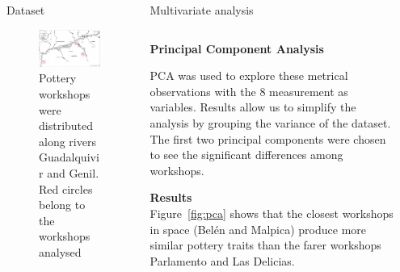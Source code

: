 \documentclass[final]{beamer}
\newlength{\sepwid}
\newlength{\onecolwid}
\newlength{\twocolwid}
\begin{document}
\begin{frame}[t]
\begin{columns}[t]
\begin{column}{\onecolwid}
\begin{block}{Dataset}
\begin{figure}
\includegraphics[width=0.7\linewidth]{images/fig1.png}
\caption{Pottery workshops were distributed along rivers Guadalquivir and Genil. Red circles belong to the workshops analysed}
\label{fig:betica}
\end{figure}



 \end{block}
\end{column} %

\begin{column}{\twocolwid}


\begin{block}{Multivariate analysis}
\begin{columns}[t,totalwidth=\twocolwid]



\begin{column}{\onecolwid} %


{\textbf{Principal Component Analysis}} 
\justify

PCA was used to explore these metrical observations with the 8 measurement as variables. Results allow us to simplify the analysis by grouping the variance of the dataset. The first two principal components were chosen to see the significant differences among workshops. 


\vspace{1cm}
{\textbf{Results}}\\
\justify
Figure~\ref{fig:pca} shows that the closest workshops in space (Bel\'en and Malpica) produce more similar pottery traits than the farer workshops Parlamento and Las Delicias.

\end{column}

\begin{column}{\sepwid}\end{column} %


\end{columns}
\end{block}
\end{column}
\end{columns}
\end{frame}
\end{document}
